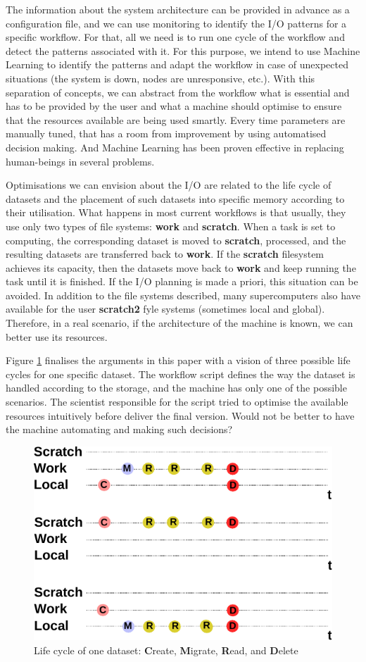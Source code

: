 \documentclass[a4paper]{article}
\begin{document}
{{{{The information about the system architecture can be provided in advance as a configuration file, and we can use monitoring to identify the I/O patterns for a specific workflow. For that, all we need is to run one cycle of the workflow and detect the patterns associated with it. For this purpose, we intend to use Machine Learning to identify the patterns and adapt the workflow in case of unexpected situations (the system is down, nodes are unresponsive, etc.).
With this separation of concepts, we can abstract from the workflow what is essential and has to be provided by the user and what a machine should optimise to ensure that the resources available are being used smartly. Every time parameters are manually tuned, that has a room from improvement by using automatised decision making. And Machine Learning has been proven effective in replacing human-beings in several problems.

Optimisations we can envision about the I/O are related to the life cycle of datasets and the placement of such datasets into specific memory according to their utilisation. What happens in most current workflows is that usually, they use only two types of file systems: \textbf{work} and \textbf{scratch}. When a task is set to computing, the corresponding dataset is moved to \textbf{scratch}, processed, and the resulting datasets are transferred back to \textbf{work}. If the \textbf{scratch} filesystem achieves its capacity, then the datasets move back to \textbf{work} and keep running the task until it is finished. If the I/O planning is made a priori, this situation can be avoided.
In addition to the file systems described, many supercomputers also have available for the user \textbf{scratch2} fyle systems (sometimes local and global). Therefore, in a real scenario, if the architecture of the machine is known, we can better use its resources.

Figure \ref{fig:lifecycle} finalises the arguments in this paper with a vision of three possible life cycles for one specific dataset. The workflow script defines the way the dataset is handled according to the storage, and the machine has only one of the possible scenarios. The scientist responsible for the script tried to optimise the available resources intuitively before deliver the final version. Would not be better to have the machine automating and making such decisions?

\begin{figure}[H]
  \centering
  \includegraphics[width=0.6\columnwidth]{lifecycle}
  \caption{Life cycle of one dataset: \textbf{C}reate, \textbf{M}igrate, \textbf{R}ead, and \textbf{D}elete}
  \label{fig:lifecycle}
\end{figure}

}}}}
\end{document}
